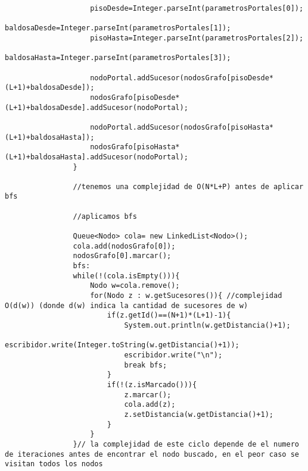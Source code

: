\begin{lstlisting}
					pisoDesde=Integer.parseInt(parametrosPortales[0]);
					baldosaDesde=Integer.parseInt(parametrosPortales[1]);
					pisoHasta=Integer.parseInt(parametrosPortales[2]);
					baldosaHasta=Integer.parseInt(parametrosPortales[3]);

					nodoPortal.addSucesor(nodosGrafo[pisoDesde*(L+1)+baldosaDesde]);
					nodosGrafo[pisoDesde*(L+1)+baldosaDesde].addSucesor(nodoPortal);
					
					nodoPortal.addSucesor(nodosGrafo[pisoHasta*(L+1)+baldosaHasta]);
					nodosGrafo[pisoHasta*(L+1)+baldosaHasta].addSucesor(nodoPortal);
				}
				
				//tenemos una complejidad de O(N*L+P) antes de aplicar bfs
				
				//aplicamos bfs
				
				Queue<Nodo> cola= new LinkedList<Nodo>();
				cola.add(nodosGrafo[0]);
				nodosGrafo[0].marcar();
				bfs:
				while(!(cola.isEmpty())){
					Nodo w=cola.remove();
					for(Nodo z : w.getSucesores()){ //complejidad O(d(w)) (donde d(w) indica la cantidad de sucesores de w)
						if(z.getId()==(N+1)*(L+1)-1){
							System.out.println(w.getDistancia()+1);
							escribidor.write(Integer.toString(w.getDistancia()+1));						
							escribidor.write("\n");
							break bfs;
						}	
						if(!(z.isMarcado())){
							z.marcar();
							cola.add(z);
							z.setDistancia(w.getDistancia()+1);
						}
					}
				}// la complejidad de este ciclo depende de el numero de iteraciones antes de encontrar el nodo buscado, en el peor caso se visitan todos los nodos


\end{lstlisting}